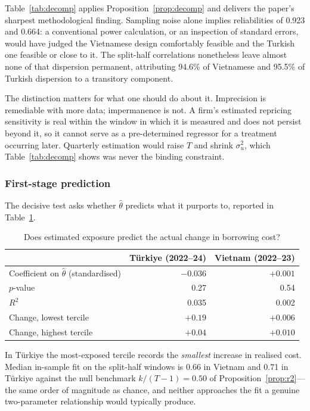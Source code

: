 \documentclass[review,12pt,authoryear]{elsarticle}
\theoremstyle{plain}
\theoremstyle{definition}
\begin{document}
Table~\ref{tab:decomp} applies Proposition~\ref{prop:decomp} and delivers the
paper's sharpest methodological finding. Sampling noise alone implies
reliabilities of 0.923 and 0.664: a conventional power calculation, or an
inspection of standard errors, would have judged the Vietnamese design
comfortably feasible and the Turkish one feasible or close to it. The
split-half correlations nonetheless leave almost none of that
dispersion permanent, attributing 94.6\% of Vietnamese and 95.5\% of Turkish
dispersion to a transitory component.

The distinction matters for what one should do about it. Imprecision is
remediable with more data; impermanence is not. A firm's estimated repricing
sensitivity is real within the window in which it is measured and does not
persist beyond it, so it cannot serve as a pre-determined regressor for a
treatment occurring later. Quarterly estimation would raise $T$ and shrink
$\sigma^2_u$, which Table~\ref{tab:decomp} shows was never the binding
constraint.

\subsubsection{First-stage prediction}

The decisive test asks whether $\widehat{\theta}$ predicts what it purports to,
reported in Table~\ref{tab:firststage}.

\begin{table}[htbp]
\centering
\caption{Does estimated exposure predict the actual change in borrowing cost?}
\label{tab:firststage}
\begin{tabular}{lrr}
\toprule
& T\"{u}rkiye (2022--24) & Vietnam (2022--23) \\
\midrule
Coefficient on $\widehat{\theta}$ (standardised) & $-0.036$ & $+0.001$ \\
$p$-value                                        & 0.27 & 0.54 \\
$R^2$                                            & 0.035 & 0.002 \\
Change, lowest tercile                           & $+0.19$ & $+0.006$ \\
Change, highest tercile                          & $\mathbf{+0.04}$ & $+0.010$ \\
\bottomrule
\end{tabular}
\end{table}

In T\"{u}rkiye the most-exposed tercile records the \emph{smallest} increase in
realised cost. Median in-sample fit on the split-half windows is 0.66 in
Vietnam and 0.71 in T\"{u}rkiye against the null benchmark $k/(T-1)=0.50$ of
Proposition~\ref{prop:r2}---the same order of magnitude as chance, and neither
approaches the fit a genuine two-parameter relationship would typically
produce.
\end{document}

